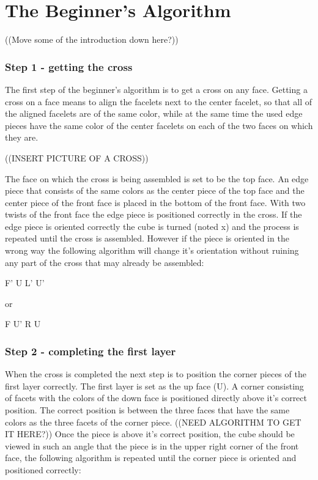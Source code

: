 \chapter{The Beginner's Algorithm}
\label{beginner}


((Move some of the introduction down here?))

\subsection{Step 1 - getting the cross}
The first step of the beginner's algorithm is to get a cross on any face. Getting a cross on a face means to align the facelets next to the center facelet, so that all of the aligned facelets are of the same color, while at the same time the used edge pieces have the same color of the center facelets on each of the two faces on which they are.

((INSERT PICTURE OF A CROSS))

The face on which the cross is being assembled is set to be the top face. An edge piece that consists of the same colors as the center piece of the top face and the center piece of the front face is placed in the bottom of the front face. With two twists of the front face the edge piece is positioned correctly in the cross. If the edge piece is oriented correctly the cube is turned (noted x) and the process is repeated until the cross is assembled. However if the piece is oriented in the wrong way the following algorithm will change it's orientation without ruining any part of the cross that may already be assembled:

F' U L' U'

or

F U' R U

\subsection{Step 2 - completing the first layer}
When the cross is completed the next step is to position the corner pieces of the first layer correctly. The first layer is set as the up face (U). A corner consisting of facets with the colors of the down face is positioned directly above it's correct  position. The correct position is between the three faces that have the same colors as the three facets of the corner piece. ((NEED ALGORITHM TO GET IT HERE?)) Once the piece is above it's correct position, the cube should be viewed in such an angle that the piece is in the upper right corner of the front face, the following algorithm is repeated until the corner piece is oriented and positioned correctly:

